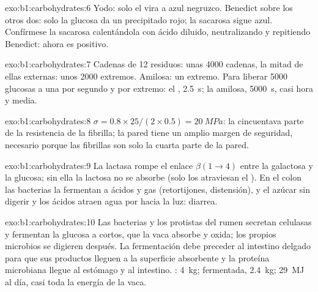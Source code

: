 \begin{solution}{exo:b1:carbohydrates:6}
Yodo: solo el  vira a azul negruzco. Benedict sobre los otros dos:
solo la glucosa da un precipitado rojo; la sacarosa sigue azul. Confírmese
la sacarosa calentándola con ácido diluido, neutralizando y repitiendo
Benedict: ahora es positivo.
\end{solution}

\begin{solution}{exo:b1:carbohydrates:7}
Cadenas de 12 residuos: unas \num{4000} cadenas, la mitad de ellas
externas: unos \num{2000} extremos. Amilosa: un extremo. Para liberar
\num{5000} glucosas a una por segundo y por extremo: el ,
\qty{2.5}{s}; la amilosa, \qty{5000}{s}, casi hora y media.
\end{solution}

\begin{solution}{exo:b1:carbohydrates:8}
$\sigma = 0.8\times 25/(2\times 0.5) = \qty{20}{MPa}$: la cincuentava parte
de la resistencia de la fibrilla; la pared tiene un amplio margen de
seguridad, necesario porque las fibrillas son solo la cuarta parte de la
pared.
\end{solution}

\begin{solution}{exo:b1:carbohydrates:9}
La lactasa rompe el enlace $\beta(1{\to}4)$ entre la galactosa y la glucosa;
sin ella la lactosa no se absorbe (solo los  atraviesan el
). En el colon las bacterias la fermentan a ácidos y gas
(retortijones, distensión), y el azúcar sin digerir y los ácidos atraen agua
por  hacia la luz: diarrea.
\end{solution}

\begin{solution}{exo:b1:carbohydrates:10}
Las bacterias y los protistas del rumen secretan celulasas y fermentan la
glucosa a  cortos, que la vaca absorbe y oxida; los propios
microbios se digieren después. La fermentación debe preceder al intestino
delgado para que sus productos lleguen a la superficie absorbente y la
proteína microbiana llegue al estómago y al intestino. : \qty{4}{kg};
fermentada, \qty{2.4}{kg}; \qty{29}{MJ} al día, casi toda la energía de la
vaca.
\end{solution}

